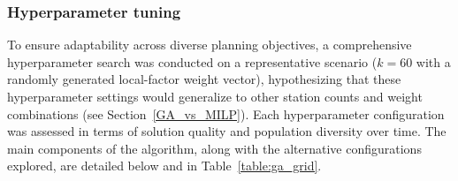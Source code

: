         \subsubsection{Hyperparameter tuning}

        To ensure adaptability across diverse planning objectives, a comprehensive hyperparameter search was conducted on a representative scenario (\(k=60\) with a randomly generated local-factor weight vector), hypothesizing that these hyperparameter settings would generalize to other station counts and weight combinations (see Section~\ref{GA_vs_MILP}). Each hyperparameter configuration was assessed in terms of solution quality and population diversity over time. The main components of the algorithm, along with the alternative configurations explored, are detailed below and in Table~\ref{table:ga_grid}. 

